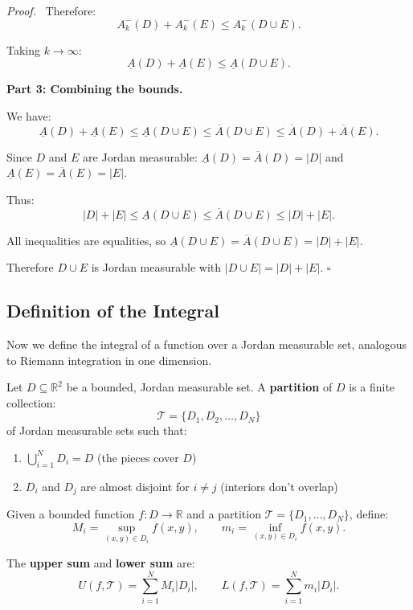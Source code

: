 \documentclass[11pt]{report}
\renewenvironment{proof}[1][Proof]{\par\noindent\textit{#1.}\ }{\hfill$\square$\par\medskip}
\newcommand{\R}{\mathbb{R}}
\begin{document}
\begin{proof}
Therefore:
\[
A_k^-(D) + A_k^-(E) \leq A_k^-(D \cup E).
\]

Taking $k \to \infty$:
\[
\underline{A}(D) + \underline{A}(E) \leq \underline{A}(D \cup E).
\]

\textbf{Part 3: Combining the bounds.}

We have:
\[
\underline{A}(D) + \underline{A}(E) \leq \underline{A}(D \cup E) \leq \overline{A}(D \cup E) \leq \overline{A}(D) + \overline{A}(E).
\]

Since $D$ and $E$ are Jordan measurable: $\underline{A}(D) = \overline{A}(D) = |D|$ and $\underline{A}(E) = \overline{A}(E) = |E|$.

Thus:
\[
|D| + |E| \leq \underline{A}(D \cup E) \leq \overline{A}(D \cup E) \leq |D| + |E|.
\]

All inequalities are equalities, so $\underline{A}(D \cup E) = \overline{A}(D \cup E) = |D| + |E|$.

Therefore $D \cup E$ is Jordan measurable with $|D \cup E| = |D| + |E|$.
\end{proof}

\subsection{Definition of the Integral}

Now we define the integral of a function over a Jordan measurable set, analogous to Riemann integration in one dimension.

\begin{definition}[Partition]
Let $D \subseteq \R^2$ be a bounded, Jordan measurable set. A \textbf{partition} of $D$ is a finite collection:
\[
\mathcal{T} = \{D_1, D_2, \ldots, D_N\}
\]
of Jordan measurable sets such that:
\begin{enumerate}
    \item $\bigcup_{i=1}^{N} D_i = D$ \quad (the pieces cover $D$)
    \item $D_i$ and $D_j$ are almost disjoint for $i \neq j$ \quad (interiors don't overlap)
\end{enumerate}
\end{definition}

\begin{definition}
Given a bounded function $f: D \to \R$ and a partition $\mathcal{T} = \{D_1, \ldots, D_N\}$, define:
\[
M_i = \sup_{(x,y) \in D_i} f(x, y), \qquad m_i = \inf_{(x,y) \in D_i} f(x, y).
\]

The \textbf{upper sum} and \textbf{lower sum} are:
\[
U(f, \mathcal{T}) = \sum_{i=1}^{N} M_i |D_i|, \qquad L(f, \mathcal{T}) = \sum_{i=1}^{N} m_i |D_i|.
\]
\end{definition}
\end{document}
